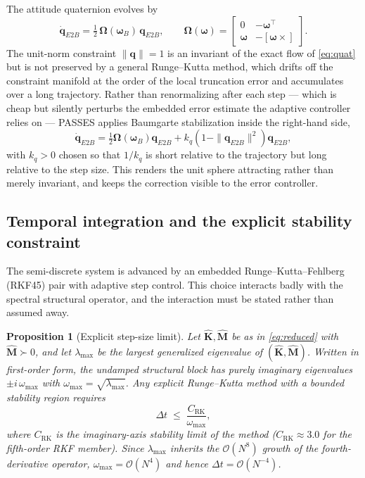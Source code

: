 \documentclass[11pt,a4paper]{article}
\newtheorem{proposition}[theorem]{Proposition}
\theoremstyle{definition}
\numberwithin{equation}{section}
\begin{document}
The attitude quaternion evolves by
\begin{equation}
\label{eq:quat}
\dot{\mathbf{q}}_{E2B} = \tfrac{1}{2}\,\bm{\Omega}(\bm{\omega}_B)\,\mathbf{q}_{E2B},
\qquad
\bm{\Omega}(\bm{\omega}) = \begin{bmatrix} 0 & -\bm{\omega}^{\!\top} \\ \bm{\omega} & -[\bm{\omega}\times] \end{bmatrix}.
\end{equation}
The unit-norm constraint $\|\mathbf{q}\| = 1$ is an invariant of the exact flow of \cref{eq:quat} but is not preserved by a general Runge--Kutta method, which drifts off the constraint manifold at the order of the local truncation error and accumulates over a long trajectory. Rather than renormalizing after each step --- which is cheap but silently perturbs the embedded error estimate the adaptive controller relies on --- PASSES applies Baumgarte stabilization inside the right-hand side,
\begin{equation}
\label{eq:baumgarte}
\dot{\mathbf{q}}_{E2B} = \tfrac{1}{2}\bm{\Omega}(\bm{\omega}_B)\mathbf{q}_{E2B} + k_q\left(1 - \|\mathbf{q}_{E2B}\|^2\right)\mathbf{q}_{E2B},
\end{equation}
with $k_q > 0$ chosen so that $1/k_q$ is short relative to the trajectory but long relative to the step size. This renders the unit sphere attracting rather than merely invariant, and keeps the correction visible to the error controller.

\subsection{Temporal integration and the explicit stability constraint}
\label{sec:integration}

The semi-discrete system is advanced by an embedded Runge--Kutta--Fehlberg (RKF45) pair with adaptive step control. This choice interacts badly with the spectral structural operator, and the interaction must be stated rather than assumed away.

\begin{proposition}[Explicit step-size limit]
\label{prop:stiff}
Let $\hat{\mathbf{K}}, \hat{\mathbf{M}}$ be as in \cref{eq:reduced} with $\hat{\mathbf{M}} \succ 0$, and let $\lambda_{\max}$ be the largest generalized eigenvalue of $(\hat{\mathbf{K}}, \hat{\mathbf{M}})$. Written in first-order form, the undamped structural block has purely imaginary eigenvalues $\pm i\,\omega_{\max}$ with $\omega_{\max} = \sqrt{\lambda_{\max}}$. Any explicit Runge--Kutta method with a bounded stability region requires
\begin{equation}
\label{eq:cfl}
\Delta t \;\le\; \frac{C_{\text{RK}}}{\omega_{\max}},
\end{equation}
where $C_{\text{RK}}$ is the imaginary-axis stability limit of the method ($C_{\text{RK}} \approx 3.0$ for the fifth-order RKF member). Since $\lambda_{\max}$ inherits the $\mathcal{O}(N^8)$ growth of the fourth-derivative operator, $\omega_{\max} = \mathcal{O}(N^4)$ and hence $\Delta t = \mathcal{O}(N^{-4})$.
\end{proposition}
\end{document}
